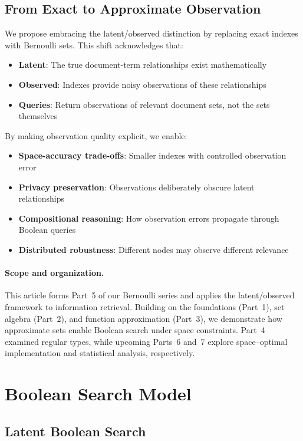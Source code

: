 \documentclass[11pt,final,hidelinks]{article}
\begin{document}
\subsection{From Exact to Approximate Observation}

We propose embracing the latent/observed distinction by replacing exact indexes with Bernoulli sets. This shift acknowledges that:
\begin{itemize}
    \item \textbf{Latent}: The true document-term relationships exist mathematically
    \item \textbf{Observed}: Indexes provide noisy observations of these relationships
    \item \textbf{Queries}: Return observations of relevant document sets, not the sets themselves
\end{itemize}

By making observation quality explicit, we enable:
\begin{itemize}
    \item \textbf{Space-accuracy trade-offs}: Smaller indexes with controlled observation error
    \item \textbf{Privacy preservation}: Observations deliberately obscure latent relationships  
    \item \textbf{Compositional reasoning}: How observation errors propagate through Boolean queries
    \item \textbf{Distributed robustness}: Different nodes may observe different relevance
\end{itemize}

\paragraph{Scope and organization.}  This article forms Part~5 of our Bernoulli series and applies the latent/observed framework to information retrieval.  Building on the foundations (Part~1), set algebra (Part~2), and function approximation (Part~3), we demonstrate how approximate sets enable Boolean search under space constraints.  Part~4 examined regular types, while upcoming Parts~6 and~7 explore space–optimal implementation and statistical analysis, respectively.

\section{Boolean Search Model}

\subsection{Latent Boolean Search}
\end{document}
